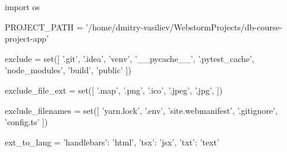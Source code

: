 \begin{pycode}
import os

PROJECT_PATH = '/home/dmitry-vasiliev/WebstormProjects/db-course-project-app'

exclude = set([
    '.git',
    '.idea',
    'venv',
    '__pycache__',
    '.pytest_cache',
    'node_modules',
    'build',
    'public'
])

exclude_file_ext = set([
    '.map',
    '.png',
    '.ico',
    '.jpeg',
    '.jpg',
])

exclude_filenames = set([
    'yarn.lock',
    '.env',
    'site.webmanifest',
    '.gitignore',
    'config.ts'
])

ext_to_lang = {
    'handlebars': 'html',
    'tsx': 'jsx',
    'txt': 'text'
}
\end{pycode}